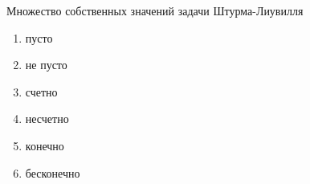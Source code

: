 Множество собственных значений задачи Штурма-Лиувилля

\begin{enumerate}[label=\arabic*)]
    \item пусто
    \item не пусто
    \item счетно
    \item несчетно
    \item конечно
    \item бесконечно
\end{enumerate}

